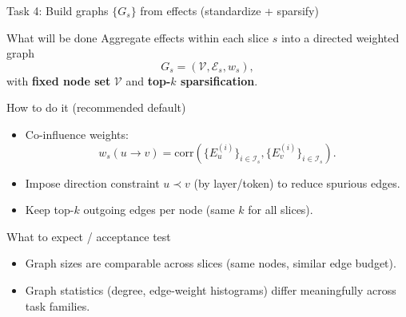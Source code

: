 \documentclass[aspectratio=169,xcolor={dvipsnames}]{beamer}
\renewcommand{\accent}[1]{\textbf{#1}}
\begin{document}
\begin{frame}[shrink=20]{Task 4: Build graphs $\{G_s\}$ from effects (standardize + sparsify)}
\small
\begin{block}{What will be done}
Aggregate effects within each slice $s$ into a directed weighted graph
\[
G_s=(\mathcal{V},\mathcal{E}_s,w_s),
\]
with \accent{fixed node set} $\mathcal{V}$ and \accent{top-$k$ sparsification}.
\end{block}

\begin{block}{How to do it (recommended default)}
\begin{itemize}\setlength\itemsep{3pt}
\item Co-influence weights:
\[
w_s(u\to v)=\mathrm{corr}\left(\{E_u^{(i)}\}_{i\in\mathcal{I}_s},\{E_v^{(i)}\}_{i\in\mathcal{I}_s}\right).
\]
\item Impose direction constraint $u\prec v$ (by layer/token) to reduce spurious edges.
\item Keep top-$k$ outgoing edges per node (same $k$ for all slices).
\end{itemize}
\end{block}

\begin{block}{What to expect / acceptance test}
\begin{itemize}\setlength\itemsep{2pt}
\item Graph sizes are comparable across slices (same nodes, similar edge budget).
\item Graph statistics (degree, edge-weight histograms) differ meaningfully across task families.
\end{itemize}
\end{block}
\end{frame}
\end{document}

